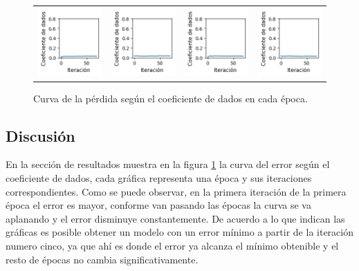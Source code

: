 \begin{figure}[!b]
\begin{tabular}{cccc}
        \includegraphics[width=3.5cm]{../Plots/dl_epoch_12.png} &
        \includegraphics[width=3.5cm]{../Plots/dl_epoch_13.png} &
        \includegraphics[width=3.5cm]{../Plots/dl_epoch_14.png} &

        \includegraphics[width=3.5cm]{../Plots/dl_epoch_15.png} \\

    \end{tabular}        
    \caption{Curva de la pérdida según el coeficiente de dados en cada época.}
    \label{fig:dice_loss_epochs}
\end{figure}


\subsection{Discusión}
En la sección de resultados muestra en la figura \ref{fig:dice_loss_epochs} la curva del error según el coeficiente de dados, cada gráfica representa una época y sus iteraciones correspondientes. Como se puede observar, en la primera iteración de la primera época el error es mayor, conforme van pasando las épocas la curva se va aplanando y el error disminuye constantemente. De acuerdo a lo que indican las gráficas es posible obtener un modelo con un error mínimo a partir de la iteración numero cinco, ya que ahí es donde el error ya alcanza el mínimo obtenible y el resto de épocas no cambia significativamente.

